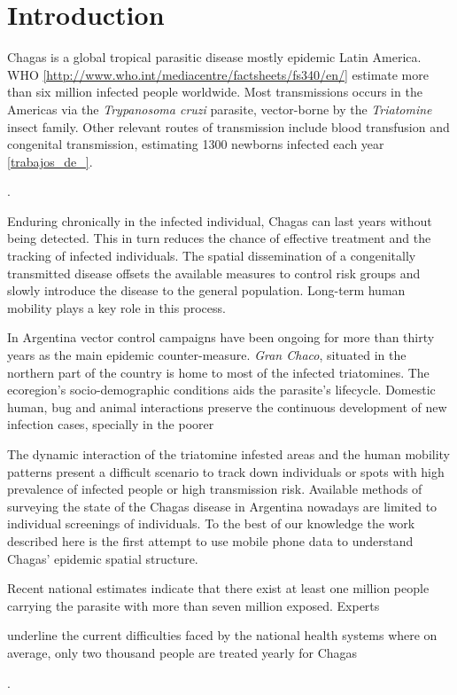 \section{Introduction}

Chagas is a global tropical parasitic disease mostly epidemic Latin America. WHO \ref{http://www.who.int/mediacentre/factsheets/fs340/en/} estimate more than six million infected people worldwide. Most transmissions occurs in the Americas via the \textit{Trypanosoma cruzi} parasite, vector-borne by the \textit{Triatomine} insect family. Other relevant routes of transmission include blood transfusion and congenital transmission, estimating 1300 newborns infected each year \ref{trabajos_de_}.\begin{comment}  en el drive estan las ppt del min salud \end{comment}. 

Enduring chronically in the infected individual, Chagas can last years without being detected. This in turn reduces the chance of effective treatment and the tracking of infected individuals. The spatial dissemination of a congenitally transmitted disease offsets the available measures to control risk groups and slowly introduce the disease to the general population. Long-term human mobility plays a key role in this process.

In Argentina vector control campaigns have been ongoing for more than thirty years as the main epidemic counter-measure. \textit{Gran Chaco}, situated in the northern part of the country is home to most of the infected triatomines. The ecoregion's socio-demographic conditions aids the parasite's lifecycle. Domestic human, bug and animal interactions preserve the continuous development of new infection cases, specially in the poorer 
 
The dynamic interaction of the triatomine infested areas and the human mobility patterns present a difficult scenario to track down individuals or spots with high prevalence of infected people or high transmission risk. Available methods of surveying the state of the Chagas disease in Argentina nowadays are limited to individual screenings of individuals. To the best of our knowledge the work described here is the first attempt to use mobile phone data to understand Chagas' epidemic spatial structure. \begin{comment}  Existe una forma de decir esto de manera correcta.. o asi les parece bien? \end{comment}

Recent national estimates indicate that there exist at least one million people carrying the parasite with more than seven million exposed. Experts \begin{comment}  aca como referencio a Diego Weinberg y Mundo Sano? \end{comment} underline the current difficulties faced by the national health systems where on average, only two thousand people are treated yearly for Chagas  \begin{comment}  aca nuevamente esta referencia es de MS \end{comment}. 

